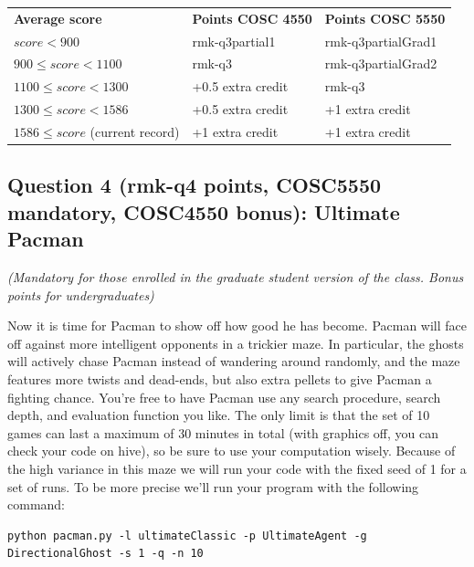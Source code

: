 \documentclass{article}
\newcommand{\points}[1]{\csname rmk-#1\endcsname}
\begin{document}
\vspace{10pt}
\noindent
\begin{tabular}{lll}
\textbf{Average score}                & \textbf{Points COSC 4550} & \textbf{Points COSC 5550}\\
$score < 900$                         & \points{q3partial1}        & \points{q3partialGrad1}\\
$900 \leq score < 1100$               & \points{q3}               & \points{q3partialGrad2}\\
$1100 \leq score < 1300$              & +0.5 extra credit         & \points{q3}\\
$1300 \leq score < 1586$              & +0.5 extra credit         & +1 extra credit\\
$1586 \leq score$ (current record)    & +1 extra credit           & +1 extra credit\\
\end{tabular}
\vspace{10pt}



\subsection{Question 4 (\points{q4} points, COSC5550 mandatory, COSC4550 bonus): Ultimate Pacman} 
\noindent \emph{(Mandatory for those enrolled in the graduate student version of the class. Bonus points for undergraduates)}

Now it is time for Pacman to show off how good he has become. Pacman will face off against more intelligent opponents in a trickier maze. In particular, the ghosts will actively chase Pacman instead of wandering around randomly, and the maze features more twists and dead-ends, but also extra pellets to give Pacman a fighting chance. You're free to have Pacman use any search procedure, search depth, and evaluation function you like. The only limit is that the set of 10 games can last a maximum of 30 minutes in total (with graphics off, you can check your code on hive), so be sure to use your computation wisely. Because of the high variance in this maze we will run your code with the fixed seed of 1 for a set of runs. To be more precise we'll run your program with the following command:

\begin{scriptsize}
\begin{verbatim}
python pacman.py -l ultimateClassic -p UltimateAgent -g DirectionalGhost -s 1 -q -n 10
\end{verbatim}
\end{scriptsize}
\end{document}
